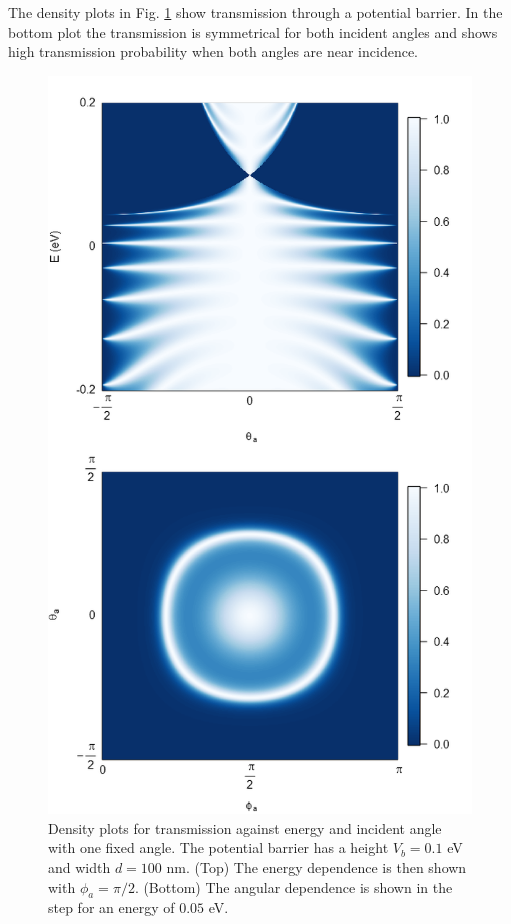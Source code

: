 \documentclass[prb,twocolumn,aps,superscriptaddress,showpacs,floatfix]{revtex4}
\begin{document}
	The density plots in Fig. \ref{weyl-t} show transmission through a potential barrier. In the bottom plot the transmission is symmetrical for both incident angles and shows high transmission probability when both angles are near incidence. 
\begin{figure}
	\centerline{\includegraphics[scale=0.4]{weyl-t}}
	\caption{Density plots for transmission against energy and incident angle with one fixed angle. The potential barrier has a height $V_{b}=0.1$ eV and width $d=100$ nm. (Top) The energy dependence is then shown with $\phi_{a}=\pi/2$. (Bottom) The angular dependence is shown in the step for an energy of $0.05$ eV.}
	\label{weyl-t}
\end{figure}
\end{document}
